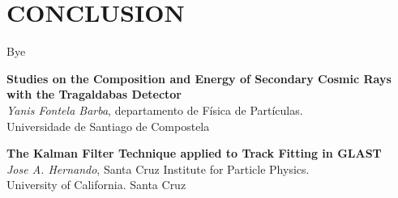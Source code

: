 \documentclass[a4paper, onseide, 12pt]{article}
\begin{document}
\section{CONCLUSION}
Bye



\begin{thebibliography}{9}
    \textbf{Studies on the Composition and Energy of Secondary Cosmic Rays with the Tragaldabas Detector}\\
    \textit{Yanis Fontela Barba}, departamento de Física de Partículas.\\
    \textsf{Universidade de Santiago de Compostela}

    \textbf{The Kalman Filter Technique applied to Track Fitting in GLAST}\\
    \textit{Jose A. Hernando}, Santa Cruz Institute for Particle Physics.\\
    \textsf{University of California. Santa Cruz}

\end{thebibliography}
\end{document}
